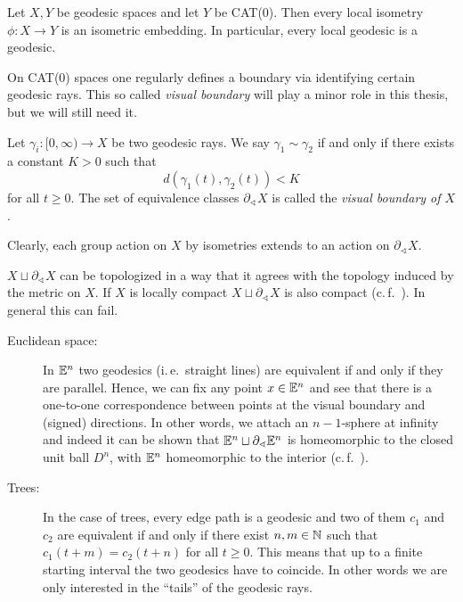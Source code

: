 \begin{prop}
  Let \(X,Y\) be geodesic spaces and let \(Y\) be CAT(0). Then every local isometry \(\phi \colon X \to Y\) is an isometric embedding. In particular, every local geodesic is a geodesic.
\end{prop}

On CAT(0) spaces one regularly defines a boundary via identifying certain geodesic rays. This so called \emph{visual boundary} will play a minor role in this thesis, but we will still need it. 

\begin{defin}
  \label{defin:visual}
  Let \(\gamma_i \colon [0, \infty) \to X\) be two geodesic rays. We say \(\gamma_1 \sim \gamma_2\) if and only if there exists a constant \(K > 0 \) such that
  \[
    d(\gamma_1(t), \gamma_2(t)) < K
  \]
  for all \(t \geq 0\). The set of equivalence classes \(\partial_\sphericalangle X\) is called the \emph{visual boundary of \(X\)}.

  Clearly, each group action on \(X\) by isometries extends to an action on \(\partial_\sphericalangle X\).
\end{defin}

\begin{rem}
  \(X \sqcup \partial_{\sphericalangle}X\) can be topologized in a way that it agrees with the topology induced by the metric on \(X\). If \(X\) is locally compact \(X \sqcup \partial_\sphericalangle X\) is also compact (c.\,f.~\cite[Sec.~II.8]{MR1744486}). In general this can fail.
\end{rem}

\begin{bsp}
  \begin{description}
  \item[Euclidean space:] In \(\mathbb{E}^n\) two geodesics (i.\,e.\ straight lines) are equivalent if and only if they are parallel. Hence, we can fix any point \(x \in \mathbb{E}^n\) and see that there is a one-to-one correspondence between points at the visual boundary and (signed) directions. In other words, we attach an \(n-1\)-sphere at infinity and indeed it can be shown that \(\mathbb{E}^n \sqcup \partial_\sphericalangle \mathbb{E}^n\) is homeomorphic to the closed unit ball \(D^n\), with \(\mathbb{E}^n\) homeomorphic to the interior (c.\,f.~\cite[Section~II.8]{MR1744486}).
  \item[Trees:] In the case of trees, every edge path is a geodesic and two of them \(c_1\) and \(c_2\) are equivalent if and only if there exist \(n,m \in \mathbb{N}\) such that \(c_1(t+m) = c_2(t+n)\) for all \(t\geq0\). This means that up to a finite starting interval the two geodesics have to coincide. In other words we are only interested in the \enquote{tails} of the geodesic rays.
  \end{description}
\end{bsp}

